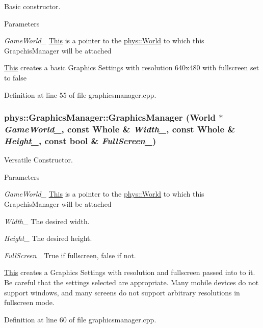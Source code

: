 Basic constructor. 


\begin{DoxyParams}{Parameters}
\item[{\em GameWorld\_\-}]\hyperlink{structThis}{This} is a pointer to the \hyperlink{classphys_1_1World}{phys::World} to which this GrapchisManager will be attached\end{DoxyParams}
\hyperlink{structThis}{This} creates a basic Graphics Settings with resolution 640x480 with fullscreen set to false 

Definition at line 55 of file graphicsmanager.cpp.

\hypertarget{classphys_1_1GraphicsManager_ad08d99ea5279fc4aab9615aba536e9cb}{
\subsubsection[{GraphicsManager}]{\setlength{\rightskip}{0pt plus 5cm}phys::GraphicsManager::GraphicsManager ({\bf World} $\ast$ {\em GameWorld\_\-}, \/  const {\bf Whole} \& {\em Width\_\-}, \/  const {\bf Whole} \& {\em Height\_\-}, \/  const bool \& {\em FullScreen\_\-})}}
\label{dd/d63/classphys_1_1GraphicsManager_ad08d99ea5279fc4aab9615aba536e9cb}


Versatile Constructor. 


\begin{DoxyParams}{Parameters}
\item[{\em GameWorld\_\-}]\hyperlink{structThis}{This} is a pointer to the \hyperlink{classphys_1_1World}{phys::World} to which this GrapchisManager will be attached \item[{\em Width\_\-}]The desired width. \item[{\em Height\_\-}]The desired height. \item[{\em FullScreen\_\-}]True if fullscreen, false if not.\end{DoxyParams}
\hyperlink{structThis}{This} creates a Graphics Settings with resolution and fullscreen passed into to it. Be careful that the settings selected are appropriate. Many mobile devices do not support windows, and many screens do not support arbitrary resolutions in fullscreen mode. 

Definition at line 60 of file graphicsmanager.cpp.



